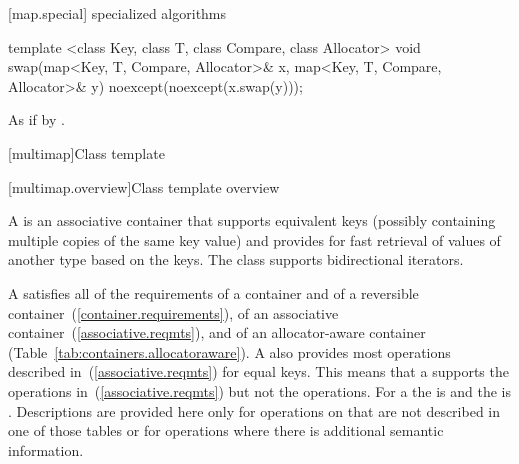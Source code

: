 [map.special]{ specialized algorithms}

%
%
\begin{itemdecl}
template <class Key, class T, class Compare, class Allocator>
  void swap(map<Key, T, Compare, Allocator>& x,
            map<Key, T, Compare, Allocator>& y)
    noexcept(noexcept(x.swap(y)));
\end{itemdecl}

\begin{itemdescr}
\pnum
\effects
As if by .
\end{itemdescr}

[multimap]{Class template }

[multimap.overview]{Class template  overview}

\pnum
{}%
A
is an associative container that supports equivalent keys (possibly containing multiple copies of
the same key value) and provides for fast retrieval of values of another type
based on the keys.
The
class
supports bidirectional iterators.

\pnum
A
 satisfies all of the requirements of a container and of a
reversible container~(\ref{container.requirements}), of an associative
container~(\ref{associative.reqmts}), and of an allocator-aware container
(Table~\ref{tab:containers.allocatoraware}).
A
also provides most operations described in~(\ref{associative.reqmts})
for equal keys.
This means that a
supports the
operations in~(\ref{associative.reqmts})
but not the
operations.
For a
the
is
and the
is
.
Descriptions are provided here only for operations on
that are not described in one of those tables
or for operations where there is additional semantic information.

